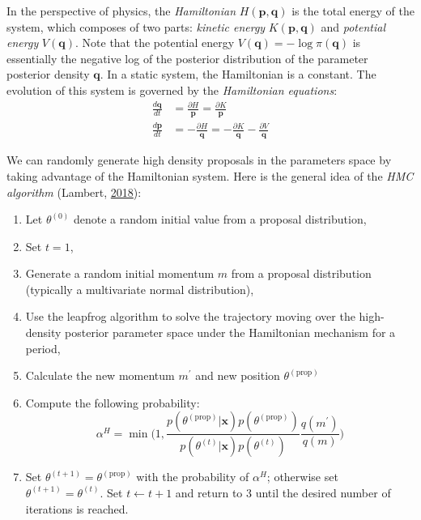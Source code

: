 \documentclass[12pt]{book}
\numberwithin{equation}{chapter}
\providecommand{\tightlist}{%
  \setlength{\itemsep}{0pt}\setlength{\parskip}{0pt}}
\begin{document}
In the perspective of physics, the \emph{Hamiltonian} \(H(\boldsymbol{p}, \boldsymbol{q})\) is the total energy of the system, which composes of two parts: \emph{kinetic energy} \(K(\boldsymbol{p}, \boldsymbol{q})\) and \emph{potential energy} \(V(\boldsymbol{q})\). Note that the potential energy \(V(\boldsymbol{q}) = -\log\pi(\boldsymbol{q})\) is essentially the negative log of the posterior distribution of the parameter posterior density \(\boldsymbol{q}\). In a static system, the Hamiltonian is a constant. The evolution of this system is governed by the \emph{Hamiltonian equations}:
\begin{equation}
\begin{aligned}
\frac{d \boldsymbol{q}}{dt} &= \frac{\partial H}{\boldsymbol{p}} = \frac{\partial K}{\boldsymbol{p}}\\
\frac{d \boldsymbol{p}}{dt} &= -\frac{\partial H}{\boldsymbol{q}} = -\frac{\partial K}{\boldsymbol{q}} - \frac{\partial V}{\boldsymbol{q}}
\label{eq:hamiltonianequation}
\end{aligned}
\end{equation}

We can randomly generate high density proposals in the parameters space by taking advantage of the Hamiltonian system. Here is the general idea of the \emph{HMC algorithm} (Lambert, \protect\hyperlink{ref-lambert2018student}{2018}):

\begin{enumerate}
\def\labelenumi{\arabic{enumi}.}
\tightlist
\item
  Let \(\theta^{(0)}\) denote a random initial value from a proposal distribution,
\item
  Set \(t = 1\),
\item
  Generate a random initial momentum \(m\) from a proposal distribution (typically a multivariate normal distribution),
\item
  Use the leapfrog algorithm to solve the trajectory moving over the high-density posterior parameter space under the Hamiltonian mechanism for a period,
\item
  Calculate the new momentum \(m^\prime\) and new position \(\theta^{(\text{prop})}\)
\item
  Compute the following probability:
  \begin{equation}
  \alpha^H = \min\bigg(1, \frac{p\left(\theta^{(\text{prop})} | \boldsymbol{x}\right)p(\theta^{(\text{prop})})}{p\left(\theta^{(t)} | \boldsymbol{x}\right)p(\theta^{(t)})} \frac{q(m^\prime)}{q(m)}\bigg)
  \label{eq:hmc}
  \end{equation}
\item
  Set \(\theta^{(t+1)} = \theta^{(\text{prop})}\) with the probability of \(\alpha^H\); otherwise set \(\theta^{(t+1)} = \theta^{(t)}\). Set \(t \leftarrow t + 1\) and return to 3 until the desired number of iterations is reached.
\end{enumerate}
\end{document}
